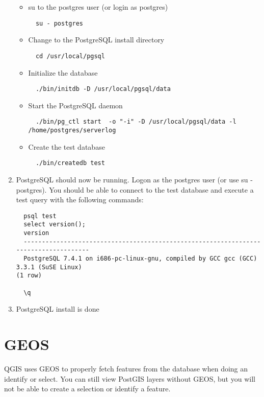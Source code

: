\documentclass[a4paper,10pt]{article}
\begin{document}
\begin{enumerate}
\begin{itemize}
\item su to the postgres user (or login as postgres)
  \begin{verbatim}
  su - postgres
  \end{verbatim}

  \item Change to the PostgreSQL install directory 
  \begin{verbatim}
  cd /usr/local/pgsql
  \end{verbatim}

  \item Initialize the database 
  \begin{verbatim}
  ./bin/initdb -D /usr/local/pgsql/data
  \end{verbatim}

  \item Start the PostgreSQL daemon 
  \small
  \begin{verbatim}
  ./bin/pg_ctl start  -o "-i" -D /usr/local/pgsql/data -l /home/postgres/serverlog 
  \end{verbatim} 
  
  \item Create the test database
  
  \begin{verbatim}
  ./bin/createdb test
  \end{verbatim}
  \normalsize
  \end{itemize}
  \item PostgreSQL should now be running. Logon as the postgres user (or use su - postgres). You should be able to connect to the test database and execute a test query with the following commands: 

  \begin{verbatim}
  psql test
  select version();
  version
  -------------------------------------------------------------------------------------
  PostgreSQL 7.4.1 on i686-pc-linux-gnu, compiled by GCC gcc (GCC) 3.3.1 (SuSE Linux)
(1 row)

  \q
  \end{verbatim}


  \item PostgreSQL install is done
  \end{enumerate}

  \section{GEOS}

  QGIS uses GEOS to properly fetch features from the database when doing an
  identify or select. You can still view PostGIS layers without GEOS, but you
  will not be able to create a selection or identify a feature.
\end{document}
